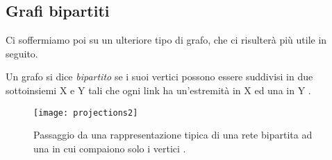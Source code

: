%
\subsection{Grafi bipartiti}
Ci soffermiamo poi su un ulteriore tipo di grafo, che ci risulterà più utile in seguito.
\begin{definizione} 
Un grafo si dice \emph{bipartito} se i suoi vertici possono essere suddivisi in due sottoinsiemi X e Y tali che ogni link ha un'estremità in X ed una in Y \cite{Bondy}. 
\end{definizione}
\begin{figure}[h]
	\begin{center}
		\texttt{[image: projections2]}
		\caption{Passaggio da una rappresentazione tipica di una rete bipartita ad una in cui compaiono solo i vertici \cite{Newman}.}
		\label{fig:proj2}
	\end{center}
\end{figure}

